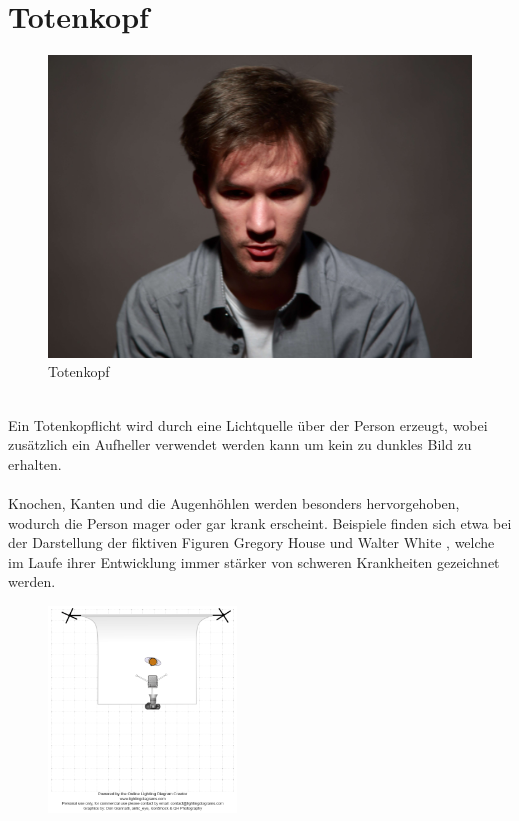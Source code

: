 \documentclass[landscape, notoc]{school}
\begin{document}
\newpage
\section{Totenkopf}
\begin{minipage}[t]{.55\textwidth}
\begin{figure}[H]
	\centering
	\includegraphics[width=12cm]{4-totenkopf.jpg}
	\caption{Totenkopf}
\end{figure}
\end{minipage}
\begin{minipage}[t]{.45\textwidth}~\\
Ein Totenkopflicht wird durch eine Lichtquelle über der Person erzeugt, wobei zusätzlich ein Aufheller verwendet werden kann um kein zu dunkles Bild zu erhalten.
\\\\
Knochen, Kanten und die Augenhöhlen werden besonders hervorgehoben, wodurch die Person mager oder gar krank erscheint. Beispiele finden sich etwa bei der Darstellung der fiktiven Figuren Gregory House \cite{gregory-house} und Walter White \cite{walter-white}, welche im Laufe ihrer Entwicklung immer stärker von schweren Krankheiten gezeichnet werden.
\begin{figure}[H]
	\centering
	\includegraphics[width=5cm]{4-totenkopf-diagram.png}
\end{figure}
\end{minipage}
\end{document}
